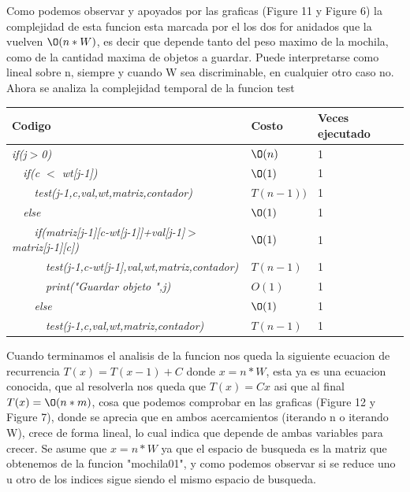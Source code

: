 \documentclass[spanish]{article}
\begin{document}
	Como podemos observar y apoyados por las graficas (Figure 11 y Figure 6) la complejidad de esta funcion esta marcada por el los dos for anidados que la vuelven $\O(n*W)$, es decir que depende tanto del peso maximo de la mochila, como de la cantidad maxima de objetos a guardar. Puede interpretarse como lineal sobre n, siempre y cuando W sea discriminable, en cualquier otro caso no.\\
	Ahora se analiza la complejidad temporal de la funcion test\\
	\begin{center}
		\begin{table}[H]
			\begin{tabular}{|l|l|l|}
				\hline
				\rowcolor[HTML]{FFCC67} 
				Codigo                           & Costo & Veces ejecutado \\ \hline
				\textit{if(j$>$0)}                    & $\O(n)$    & 1               \\ \hline
				\textit{\  \  if(c $<$ wt[j-1])}                    & $\O(1)$    & 1               \\ \hline
				\textit{\  \  \  \  test(j-1,c,val,wt,matriz,contador)}                    & $T(n-1))$    & 1               \\ \hline
				\textit{\  \  else}                    & $\O(1)$    & 1               \\ \hline
				\textit{\  \  \  \  if(matriz[j-1][c-wt[j-1]]+val[j-1]$>$matriz[j-1][c])}                    & $\O(1)$    & 1               \\ \hline 					
				\textit{\  \  \  \  \  \  test(j-1,c-wt[j-1],val,wt,matriz,contador)}                    & $T(n-1)$    & 1               \\ \hline
				\textit{\  \  \  \  \  \  print("Guardar objeto ",j)}                    & $O(1)$    & 1               \\ \hline  
				\textit{\  \  \  \  else}                    & $\O(1)$    & 1              \\ \hline 
				\textit{\  \  \  \  \  \  test(j-1,c,val,wt,matriz,contador)}                    & $T(n-1)$    & 1               \\ \hline 								
			\end{tabular}
		\end{table}										
	\end{center}
	Cuando terminamos el analisis de la funcion nos queda la siguiente ecuacion de recurrencia $T(x) = T(x-1) + C$ donde $x = n*W$, esta ya es una ecuacion conocida, que al resolverla nos queda que $T(x) = Cx$ asi que al final $T(x)=\O(n*m)$, cosa que podemos comprobar en las graficas (Figure 12 y Figure 7), donde se aprecia que en ambos acercamientos (iterando n o iterando W), crece de forma lineal, lo cual indica que depende de ambas variables para crecer. Se asume que $x = n*W$ ya que el espacio de busqueda es la matriz que obtenemos de la funcion "mochila01", y como podemos observar si se reduce uno u otro de los indices sigue siendo el mismo espacio de busqueda.
\end{document}
